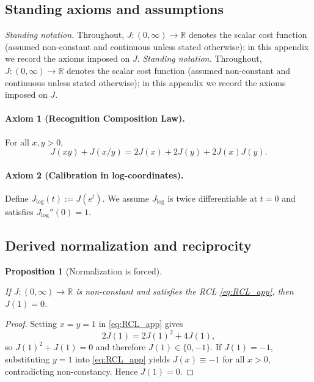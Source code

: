 \documentclass[11pt,reqno]{amsart}
\newtheorem{proposition}[theorem]{Proposition}
\theoremstyle{definition}
\theoremstyle{remark}
\newcommand{\R}{\mathbb{R}}
\newcommand{\1}{\mathbf{1}}
\begin{document}
\subsection{Standing axioms and assumptions}\label{app:RCL:axioms}


\noindent\emph{Standing notation.} Throughout, $J:(0,\infty)\to\mathbb R$ denotes the scalar cost function (assumed non-constant and continuous unless stated otherwise); in this appendix we record the axioms imposed on $J$.
\noindent\emph{Standing notation.} Throughout, $J:(0,\infty)\to\mathbb R$ denotes the scalar cost function (assumed non-constant and continuous unless stated otherwise); in this appendix we record the axioms imposed on $J$.

\paragraph{Axiom 1 (Recognition Composition Law).} For all $x,y>0$,
\begin{equation}\tag{RCL}\label{eq:RCL_app}
J(xy)+J(x/y)=2J(x)+2J(y)+2J(x)J(y).
\end{equation}

\paragraph{Axiom 2 (Calibration in log-coordinates).} Define $J_{\log}(t):=J(e^{t})$. We assume $J_{\log}$ is twice differentiable at $t=0$ and satisfies $J_{\log}''(0)=1$.


\subsection{Derived normalization and reciprocity}

\begin{proposition}[Normalization is forced]\label{prop:norm-forced-vv}

If $J:(0,\infty)\to\R$ is non-constant and satisfies the RCL \eqref{eq:RCL_app}, then $J(1)=0$.

\end{proposition}

\begin{proof}

Setting $x=y=1$ in \eqref{eq:RCL_app} gives
\[
2J(1)=2J(1)^2+4J(1),
\]
so $J(1)^2+J(1)=0$ and therefore $J(1)\in\{0,-1\}$.
If $J(1)=-1$, substituting $y=1$ into \eqref{eq:RCL_app} yields $J(x)\equiv -1$ for all $x>0$, contradicting non-constancy.
Hence $J(1)=0$.

\end{proof}
\end{document}
